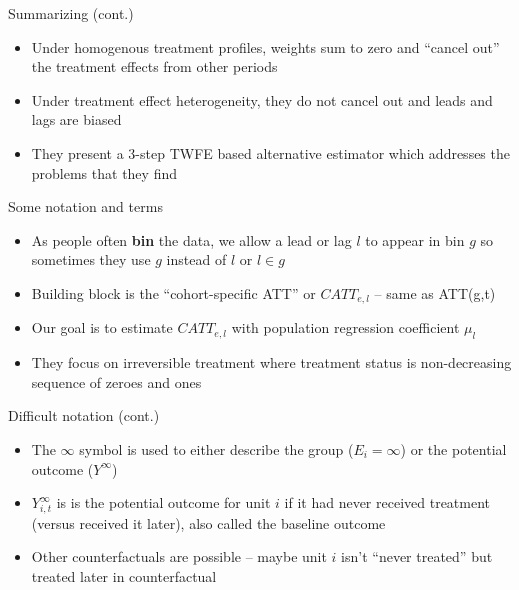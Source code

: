 \documentclass{beamer}
\begin{document}
\begin{frame}{Summarizing (cont.)}

\begin{itemize}
\item Under homogenous treatment profiles, weights sum to zero and ``cancel out'' the treatment effects from other periods 
\item Under treatment effect heterogeneity, they do not cancel out and leads and lags are biased
\item They present a 3-step TWFE based alternative estimator which addresses the problems that they find
\end{itemize}

\end{frame}


\begin{frame}{Some notation and terms}

\begin{itemize}
\item As people often \textbf{bin} the data, we allow a lead or lag $l$ to appear in bin $g$ so sometimes they use $g$ instead of $l$ or $l \in g$
\item Building block is the ``cohort-specific ATT'' or $CATT_{e,l}$ -- same as ATT(g,t)
\item Our goal is to estimate $CATT_{e,l}$ with population regression coefficient $\mu_l$
\item They focus on irreversible treatment where treatment status is non-decreasing sequence of zeroes and ones
\end{itemize}

\end{frame}



\begin{frame}{Difficult notation (cont.)}

\begin{itemize}
\item The $\infty$ symbol is used to either describe the group ($E_i=\infty$) or the potential outcome ($Y^{\infty}$)
\item $Y^{\infty}_{i,t}$ is is the potential outcome for unit $i$ if it had never received treatment (versus received it later), also called the baseline outcome
\item Other counterfactuals are possible -- maybe unit $i$ isn't ``never treated'' but treated later in counterfactual
\end{itemize}
\end{frame}
\end{document}
